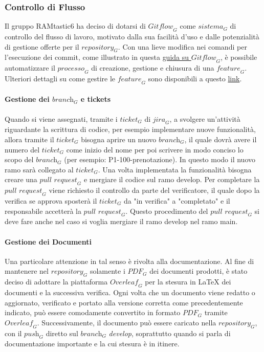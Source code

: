 \subsubsection{Controllo di Flusso}
Il gruppo RAMtastic6 ha deciso di dotarsi di $\textit{Gitflow}_G$ come $\textit{sistema}_G$ di controllo del flusso di lavoro, motivato dalla sua facilità d'uso e dalle potenzialità di gestione offerte per il $\textit{repository}_G$. Con una lieve modifica nei comandi per l'esecuzione dei commit, come illustrato in questa \href{https://www.atlassian.com/git/tutorials/comparing-workflows/gitflow-workflow}{guida su $\textit{Gitflow}_G$}, è possibile automatizzare il $\textit{processo}_G$ di creazione, gestione e chiusura di una $\textit{feature}_G$. Ulteriori dettagli su come gestire le $\textit{feature}_G$ sono disponibili a questo \href{http://danielkummer.github.io/git-flow-cheatsheet/}{link}.
\paragraph{Gestione dei $\textit{branch}_G$ e tickets}
Quando si viene assegnati, tramite i $\textit{ticket}_G$ di $\textit{jira}_G$, a svolgere un'attività riguardante la scrittura di codice, per esempio implementare nuove funzionalità, allora tramite il $\textit{ticket}_G$ bisogna aprire un nuovo $\textit{branch}_G$, il quale dovrà avere il numero del $\textit{ticket}_G$ come inizio del nome per poi scrivere in modo conciso lo scopo del $\textit{branch}_G$ (per esempio: P1-100-prenotazione). In questo modo il nuovo ramo sarà collegato al $\textit{ticket}_G$. Una volta implementata la funzionalità bisogna creare una $\textit{pull request}_G$ e mergiare il codice sul ramo develop.
Per completare la $\textit{pull request}_G$ viene richiesto il controllo da parte del verificatore, il quale dopo la verifica se approva sposterà il $\textit{ticket}_G$ da "in verifica" a "completato" e il responsabile accetterà la $\textit{pull request}_G$. Questo procedimento del $\textit{pull request}_G$ si deve fare anche nel caso si voglia mergiare il ramo develop nel ramo main.
\paragraph{Gestione dei Documenti}
Una particolare attenzione in tal senso è rivolta alla documentazione. Al fine di mantenere nel $\textit{repository}_G$ solamente i $\textit{PDF}_G$ dei documenti prodotti, è stato deciso di adottare la piattaforma \href{https://www.overleaf.com/project}{$\textit{Overleaf}_G$} per la stesura in LaTeX dei documenti e la successiva verifica. Ogni volta che un documento viene redatto o aggiornato, verificato e portato alla versione corretta come precedentemente indicato, può essere comodamente convertito in formato $\textit{PDF}_G$ tramite $\textit{Overleaf}_G$. Successivamente, il documento può essere caricato nella $\textit{repository}_G$, con il $\textit{push}_G$ diretto sul $\textit{branch}_G$ \textit{develop}, soprattutto quando si parla di documentazione importante e la cui stesura è in itinere.

